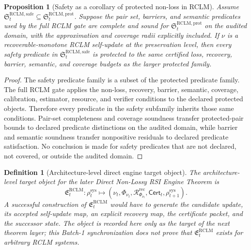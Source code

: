 \documentclass[11pt,a4paper]{article}
\newtheorem{proposition}[theorem]{Proposition}
\newtheorem{definition}[theorem]{Definition}
\newcommand{\RCLM}{\mathrm{RCLM}}
\newcommand{\sys}{\mathrm{sys}}
\newcommand{\rec}{\mathrm{rec}}
\newcommand{\safe}{\mathrm{safe}}
\newcommand{\prot}{\mathrm{prot}}
\begin{document}
\begin{proposition}[Safety as a corollary of protected non-loss in RCLM]
\label{prop:rclm-safety-as-corollary}
Assume \(\mathfrak S_t^{\RCLM,\safe}\subseteq\mathfrak S_t^{\RCLM,\prot}\).  Suppose the pair set, barriers, and semantic predicates used by the full RCLM gate are complete and sound for \(\mathfrak S_t^{\RCLM,\prot}\) on the audited domain, with the approximation and coverage radii explicitly included.  If \(\nu\) is a recoverable-monotone RCLM self-update at the preservation level, then every safety predicate in \(\mathfrak S_t^{\RCLM,\safe}\) is protected to the same certified loss, recovery, barrier, semantic, and coverage budgets as the larger protected family.
\end{proposition}

\begin{proof}
The safety predicate family is a subset of the protected predicate family.  The full RCLM gate applies the non-loss, recovery, barrier, semantic, coverage, calibration, estimator, resource, and verifier conditions to the declared protected objects.  Therefore every predicate in the safety subfamily inherits those same conditions.  Pair-set completeness and coverage soundness transfer protected-pair bounds to declared predicate distinctions on the audited domain, while barrier and semantic soundness transfer nonpositive residuals to declared predicate satisfaction.  No conclusion is made for safety predicates that are not declared, not covered, or outside the audited domain.
\end{proof}

\begin{definition}[Architecture-level direct engine target object]
\label{def:rclm-direct-engine-target-object}
The architecture-level target object for the later Direct Non-Lossy RSI Engine Theorem is
\[
\mathfrak E_t^{\RCLM}:\rho_t^{\sys}
\longmapsto
(\nu_t,\Phi_{\nu_t},\mathcal R_{\Phi_{\nu_t}}^{\rec},\mathsf{Cert}_t,\rho_{t+1}^{\sys}).
\]
A successful construction of \(\mathfrak E_t^{\RCLM}\) would have to generate the candidate update, its accepted self-update map, an explicit recovery map, the certificate packet, and the successor state.  The object is recorded here only as the target of the next theorem layer; this Batch-1 synchronization does not prove that \(\mathfrak E_t^{\RCLM}\) exists for arbitrary RCLM systems.
\end{definition}
\end{document}
